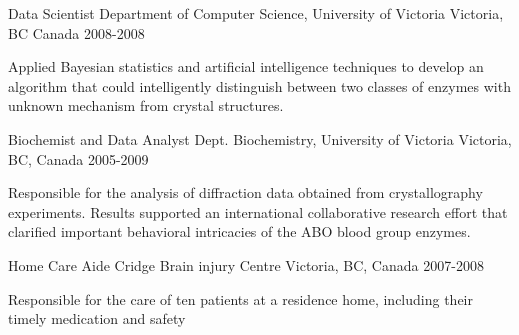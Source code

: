 


\begin{cventries}

\cventry
{Data Scientist} %
{Department of Computer Science, University of Victoria} %
{Victoria, BC Canada} %
{2008-2008} %
{ %
\begin{cvitems}
\item {Applied Bayesian statistics and artificial intelligence techniques to develop an algorithm that could intelligently distinguish between two classes of enzymes with unknown mechanism from crystal structures.}
\end{cvitems}
}


\cventry
{Biochemist and Data Analyst} %
{Dept. Biochemistry, University of Victoria} %
{Victoria, BC, Canada} %
{2005-2009} %
{ %
\begin{cvitems}
\item {Responsible for the analysis of diffraction data obtained from crystallography experiments. Results supported an international collaborative research effort that clarified important behavioral intricacies of the ABO blood group enzymes. }
\end{cvitems}
}


\cventry
{Home Care Aide} %
{Cridge Brain injury Centre} %
{Victoria, BC, Canada} %
{2007-2008} %
{ %
\begin{cvitems}
\item {Responsible for the care of ten patients at a residence home, including their timely medication and safety}
\end{cvitems} 
}


\end{cventries}
